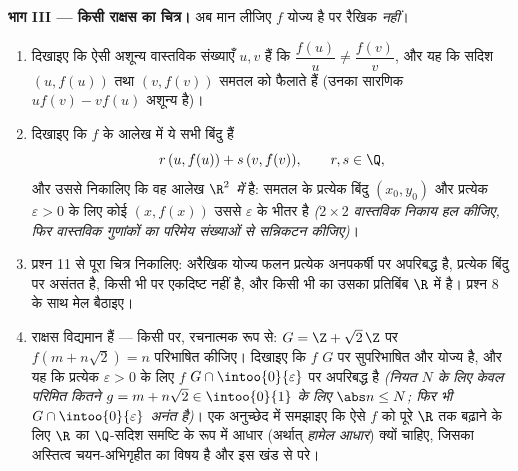 \begin{problem}[{सप्ताहांत समस्या --- $f(x + y) = f(x) + f(y)$: नियमितता रैखिकता पर बाध्य कर देती है, और राक्षसों
का चित्र}]
\medskip \noindent\textbf{भाग III --- किसी राक्षस का चित्र।} अब मान लीजिए
$f$ योज्य है पर रैखिक \emph{नहीं}।
\begin{enumerate}[resume]
  \item दिखाइए कि ऐसी अशून्य वास्तविक संख्याएँ $u, v$ हैं कि
  $\dfrac{f(u)}{u} \neq \dfrac{f(v)}{v}$, और यह कि सदिश $(u, f(u))$ तथा $(v,
  f(v))$ समतल को फैलाते हैं (उनका सारणिक $u f(v) - v f(u)$ अशून्य है)।
  \item दिखाइए कि $f$ के आलेख में ये सभी बिंदु हैं
        \[
        r\,(u, f(u)) + s\,(v, f(v)), \qquad r, s \in \Q ,
        \]
        और उससे निकालिए कि वह आलेख \emph{$\R^2$ में } है: समतल के
        प्रत्येक बिंदु $(x_0, y_0)$ और प्रत्येक $\varepsilon > 0$ के लिए कोई
        $(x, f(x))$ उससे $\varepsilon$ के भीतर है \emph{($2\times2$ वास्तविक
        निकाय हल कीजिए, फिर वास्तविक गुणांकों का परिमेय संख्याओं से सन्निकटन
        कीजिए)}।
  \item प्रश्न 11 से पूरा चित्र निकालिए: अरैखिक योज्य फलन प्रत्येक अनपकर्षी
   पर अपरिबद्ध है, प्रत्येक बिंदु पर असंतत है, किसी भी  पर
  एकदिष्ट नहीं है, और किसी भी  का उसका प्रतिबिंब $\R$ में  है।
  प्रश्न 8 के साथ मेल बैठाइए।
  \item राक्षस विद्यमान हैं --- किसी   पर, रचनात्मक रूप से: $G = \Z
  + \sqrt2\,\Z$ पर $f(m + n\sqrt2) = n$ परिभाषित कीजिए। दिखाइए कि $f$ $G$ पर
  सुपरिभाषित और योज्य है, और यह कि प्रत्येक $\varepsilon > 0$ के लिए $f$ $G
  \cap \intoo{0}{\varepsilon}$ पर अपरिबद्ध है \emph{(नियत $N$ के लिए केवल
  परिमित कितने $g = m + n\sqrt2 \in \intoo{0}{1}$ के लिए $\abs n \leq N$;
  फिर भी $G \cap \intoo{0}{\varepsilon}$ अनंत है)}। एक अनुच्छेद में समझाइए
  कि ऐसे $f$ को पूरे $\R$ तक बढ़ाने के लिए $\R$ का $\Q$-सदिश समष्टि के रूप
  में आधार (अर्थात् \emph{हामेल आधार}) क्यों चाहिए, जिसका अस्तित्व
  चयन-अभिगृहीत का विषय है और इस खंड से परे।
\end{enumerate}


\end{problem}
